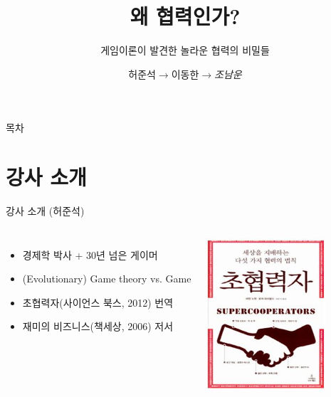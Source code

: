 \documentclass[final]{beamer}
\title{왜 협력인가?}
\subtitle{게임이론이 발견한 놀라운 협력의 비밀들}
\author[조남운]{허준석$\rightarrow$이동한$\rightarrow$\emph{조남운}\\\mail}
\begin{document}
\begin{frame}[t]{}
	\titlepage
\end{frame}

\begin{frame}[t]{목차}
	\tableofcontents
\end{frame}
\section{강사 소개} %
\label{sec:강사소개}

\begin{frame}[t]{강사 소개 (허준석)}
	\begin{columns}[c]
		\column{16em}
		\begin{itemize}
			\item 경제학 박사 + 30년 넘은 게이머 
			\item (Evolutionary) Game theory vs. Game
			\item 초협력자(사이언스 북스, 2012) 번역 
			\item 재미의 비즈니스(책세상, 2006) 저서
		\end{itemize}
		\column{14em}
		\includegraphics[width=12em]{sck.jpg}
	\end{columns}
\end{frame}
\end{document}
